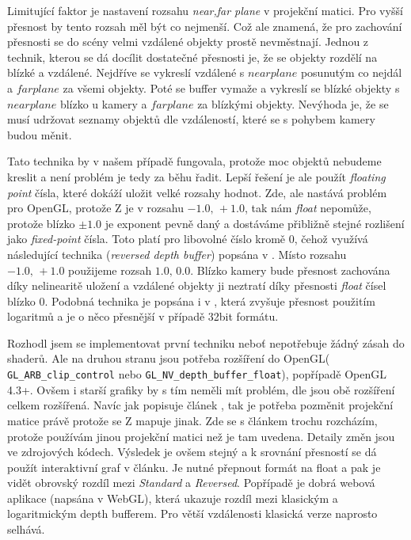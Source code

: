 Limitující faktor je nastavení rozsahu \textit{near,far plane} v projekční matici. Pro vyšší přesnost by tento rozsah měl být co nejmenší. Což ale znamená, že pro zachování přesnosti se do scény velmi vzdálené objekty prostě nevměstnají. Jednou z technik, kterou se dá docílit dostatečné přesnosti je, že se objekty rozdělí na blízké a vzdálené. Nejdříve se vykreslí vzdálené s $ near plane $ posunutým co nejdál a $ far plane $ za všemi objekty. Poté se buffer vymaže a vykreslí se blízké objekty s $ near plane $ blízko u kamery a $ far plane $ za blízkými objekty. Nevýhoda je, že se musí udržovat seznamy objektů dle vzdáleností, které se s pohybem kamery budou měnit. 

Tato technika by v našem případě fungovala, protože moc objektů nebudeme kreslit a není problém je tedy za běhu řadit. Lepší řešení je ale použít \textit{floating point} čísla, které dokáží uložit velké rozsahy hodnot. Zde, ale nastává problém pro OpenGL, protože Z je v rozsahu $ -1.0,\,+1.0 $, tak nám \textit{float} nepomůže, protože blízko $ \pm1.0 $ je exponent pevně daný a dostáváme přibližně stejné rozlišení jako \textit{fixed-point} čísla. Toto platí pro libovolné číslo kromě 0, čehož využívá následující technika (\textit{reversed depth buffer}) popsána v \cite{revBuff}. Místo rozsahu $ -1.0,\,+1.0 $ použijeme rozsah  $ 1.0,\,0.0  $. Blízko kamery bude přesnost zachována díky nelinearitě uložení a vzdálené objekty ji neztratí díky přesnosti \textit{float} čísel blízko 0. Podobná technika je popsána i v \cite{logBuff}, která zvyšuje přesnost použitím logaritmů a je o něco přesnější v případě 32bit formátu.

Rozhodl jsem se implementovat první techniku neboť nepotřebuje žádný zásah do shaderů. Ale na druhou stranu jsou potřeba rozšíření do OpenGL( \texttt{GL\_ARB\_clip\_control} nebo \texttt{GL\_NV\_depth\_buffer\_float}), popřípadě OpenGL 4.3+. Ovšem i starší grafiky by s tím neměli mít problém, dle \cite{GLEXT} jsou obě rozšíření celkem rozšířená. Navíc jak popisuje článek \cite{revBuff}, tak je potřeba pozměnit projekční matice právě protože se Z mapuje jinak. Zde se s článkem trochu rozcházím, protože používám jinou projekční matici než je tam uvedena. Detaily změn jsou ve zdrojových kódech. Výsledek je ovšem stejný a k srovnání přesností se dá použít interaktivní graf v článku. Je nutné přepnout formát na float a pak je vidět obrovský rozdíl mezi \textit{Standard} a \textit{Reversed}. Popřípadě je dobrá webová aplikace \cite{srovnaniBuffer}(napsána v WebGL), která ukazuje rozdíl mezi klasickým a logaritmickým depth bufferem. Pro větší vzdálenosti klasická verze naprosto selhává.

